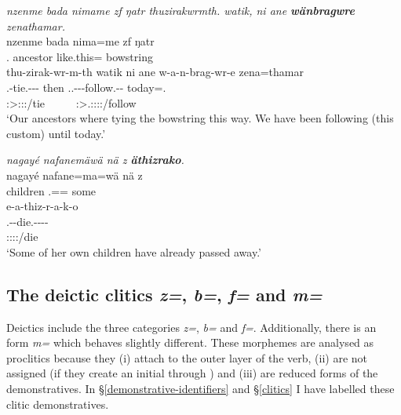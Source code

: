 \begin{exe}
	\ex \emph{nzenme bada nimame zf ŋatr thuzirakwrmth. watik, ni ane \textbf{wänbragwre} zenathamar.}\\
	\gll nzenme bada nima=me zf ŋatr\\
	\Fnsg.\Poss{} ancestor like.this=\Ins{} \Imm{} bowstring\\
	\sn
	\glll thu-zirak-wr-m-th watik ni ane w-a-n-brag-wr-e zena=thamar\\
	\Stnsg.\Betaone{}-tie.\Ext-\Ndu-\Dur-\Stnsg{} then \Fnsg{} \Dem{} \Tsg.\F.\Alph-\Vc-\Venit-follow.\Ext-\Ndu-\Fnsg{} today=\Temp.\All{}\\
	\footnotesize{\Stpl:\Sbj>\Stpl:\Obj:\Pst:\Dur/tie} ~ ~ ~ {\Fpl:\Sbj>\Tsg.\F:\Obj:\Nonpast:\Ipfv:\Venit/follow} ~\\
	\trans `Our ancestors where tying the bowstring this way. We have been following (this custom) until today.' 
	\label{ex261}
\end{exe}
\begin{exe}
	\ex \emph{nagayé nafanemäwä nä z \textbf{äthizrako}.}\\
	\gll nagayé nafane=ma=wä nä z\\
	children \Tsg.\Poss=\Char=\Emph{} some \Iam{}\\
	\sn
	\glll e-a-thiz-r-a-k-o\\
	\Stnsg.\Alph-\Vc-die.\Ext-\Ndu-\Pst-\Lk-\Andat{}\\
	\footnotesize{\Stpl:\Sbj:\Pst:\Ipfv:\Andat/die}\\
	\trans `Some of her own children have already passed away.'\\ 
	\label{ex263}
\end{exe}

\subsection{The deictic clitics \emph{z=}, \emph{b=}, \emph{f=} and \emph{m=}} \label{deicticcliticssection}

Deictics include the three categories  \emph{z=},  \emph{b=} and  \emph{f=}. Additionally, there is an  form \emph{m=} which behaves slightly different. These morphemes are analysed as proclitics because they (i) attach to the outer layer of the verb, (ii) are not assigned  (if they create an initial  through ) and (iii) are reduced forms of the demonstratives. In \S{}\ref{demonstrative-identifiers} and \S{}\ref{clitics} I have labelled these clitic demonstratives.%

